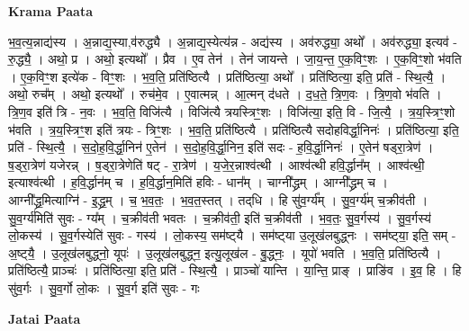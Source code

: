 \documentclass[17pt]{extarticle}
\begin{document}
\textbf{Krama Paata} \newline

भ॒व॒त्य॒न्नाद्य॑स्य । अ॒न्नाद्य॒स्या,व॑रुद्ध्यै । अ॒न्नाद्य॒स्येत्य॑न्न - अद्य॑स्य । अव॑रुद्ध्या॒ अथो᳚ । अव॑रुद्ध्या॒ इत्यव॑ - रु॒द्ध्यै॒ । अथो॒ प्र । अथो॒ इत्यथो᳚ । प्रैव । ए॒व तेन॑ । तेन॑ जायन्ते । जा॒य॒न्त॒ ए॒क॒विꣳ॒॒शः । ए॒क॒विꣳ॒॒शो भ॑वति । ए॒क॒विꣳ॒॒श इत्ये॑क - विꣳ॒॒शः । भ॒व॒ति॒ प्रति॑ष्ठित्यै । प्रति॑ष्ठित्या॒ अथो᳚ । प्रति॑ष्ठित्या॒ इति॒ प्रति॑ - स्थि॒त्यै॒ । अथो॒ रुच᳚म् । अथो॒ इत्यथो᳚ । रुच॑मे॒व । ए॒वात्मन्न् । आ॒त्मन् द॑धते । द॒ध॒ते॒ त्रि॒ण॒वः । त्रि॒ण॒वो भ॑वति । त्रि॒ण॒व इति॑ त्रि - न॒वः । भ॒व॒ति॒ विजि॑त्यै । विजि॑त्यै त्रयस्त्रिꣳ॒॒शः । विजि॑त्या॒ इति॒ वि - जि॒त्यै॒ । त्र॒य॒स्त्रिꣳ॒॒शो भ॑वति । त्र॒य॒स्त्रिꣳ॒॒श इति॑ त्रयः - त्रिꣳ॒॒शः । भ॒व॒ति॒ प्रति॑ष्ठित्यै । प्रति॑ष्ठित्यै सदोहविर्द्धा॒निनः॑ । प्रति॑ष्ठित्या॒ इति॒ प्रति॑ - स्थि॒त्यै॒ । स॒दो॒ह॒वि॒र्द्धा॒निन॑ ए॒तेन॑ । स॒दो॒ह॒वि॒र्द्धा॒निन॒ इति॑ सदः - ह॒वि॒र्द्धा॒निनः॑ । ए॒तेन॑ षड्‍रा॒त्रेण॑ । ष॒ड्‍रा॒त्रेण॑ यजेरन्न् । ष॒ड्‍रा॒त्रेणेति॑ षट् - रा॒त्रेण॑ । य॒जे॒र॒न्नाश्व॑त्थी । आश्व॑त्थी हवि॒र्द्धान᳚म् । आश्व॑त्थी॒ इत्याश्व॑त्थी । ह॒वि॒र्द्धान॑म् च । ह॒वि॒र्द्धान॒मिति॑ हविः - धान᳚म् । चाग्नी᳚द्ध्रम् । आग्नी᳚द्ध्रम् च । आग्नी᳚द्ध्र॒मित्याग्नि॑ - इ॒द्ध्र॒म् । च॒ भ॒व॒तः॒ । भ॒व॒त॒स्तत् । तद्‌धि । हि सु॑व॒र्ग्य᳚म् । सु॒व॒र्ग्य॑म् च॒क्रीव॑ती । सु॒व॒र्ग्य॑मिति॑ सुवः - ग्य᳚म् । च॒क्रीव॑ती भवतः । च॒क्रीव॑ती॒ इति॑ च॒क्रीव॑ती । भ॒व॒तः॒ सु॒व॒र्गस्य॑ । सु॒व॒र्गस्य॑ लो॒कस्य॑ । सु॒व॒र्गस्येति॑ सुवः - गस्य॑ । लो॒कस्य॒ सम॑ष्ट्‍यै । सम॑ष्ट्‍या उ॒लूख॑लबुद्ध्नः । सम॑ष्ट्‍या॒ इति॒ सम् - अ॒ष्ट्‍यै॒ । उ॒लूख॑लबुद्ध्नो॒ यूपः॑ । उ॒लूख॑लबुद्ध्न॒ इत्यु॒लूख॑ल - बु॒द्ध्नः॒ । यूपो॑ भवति । भ॒व॒ति॒ प्रति॑ष्ठित्यै । प्रति॑ष्ठित्यै॒ प्राञ्चः॑ । प्रति॑ष्ठित्या॒ इति॒ प्रति॑ - स्थि॒त्यै॒ । प्राञ्चो॑ यान्ति । या॒न्ति॒ प्राङ्‍ । प्राङि॑व । इ॒व॒ हि । हि सु॑व॒र्गः । सु॒व॒र्गो लो॒कः । सु॒व॒र्ग इति॑ सुवः - गः \newline

\textbf{Jatai Paata} \newline
\end{document}
